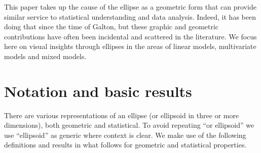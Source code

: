 \documentclass[11pt]{article}%
\begin{document}
This paper  takes up  the cause  of the  ellipse as  a geometric  form that  can
provide similar service to statistical understanding and data analysis.  Indeed,
it has been doing that since the time of Galton, but these graphic and geometric
contributions have often  been incidental and  scattered in the  literature.  We
focus here on visual  insights through ellipses in  the areas of linear  models,
multivariate models and mixed models.

\section{Notation and basic results}
There are various representations of an ellipse (or ellipsoid in three or more dimensions),
both geometric and statistical.  
To avoid repeating ``or ellipsoid'' we use ``ellipsoid'' as generic where context is clear. 
We make use of the following definitions and results in what follows for geometric and
statistical properties.
\end{document}
